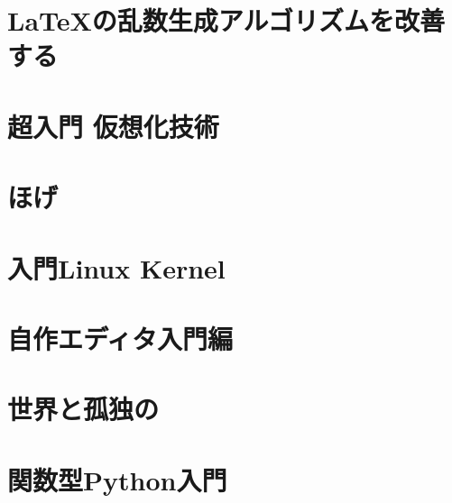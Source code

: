 \documentclass[autodetect-engine,dvipdfmx-if-dvi,ja=standard,a5paper,10.5pt,twoside,openany,layout=v2]{bxjsbook}
\newcommand{\articlepath}{./articles}
\begin{document}
\tableofcontents
\mainmatter
{}
\chapter{\LaTeX の乱数生成アルゴリズムを改善する}


\chapter{超入門 仮想化技術}


\chapter{ほげ}


\chapter{入門Linux Kernel}


\chapter{自作エディタ入門編}


\chapter{世界と孤独の}


\chapter{関数型Python入門}


\newpage
\myimpression
\end{document}

